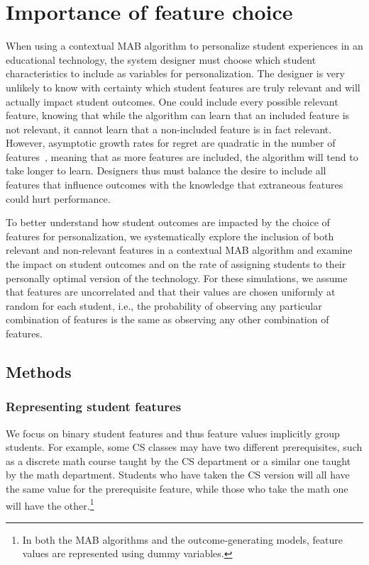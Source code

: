 \section{Importance of feature choice}

When using a contextual MAB algorithm to personalize student experiences in an educational technology, the system designer must choose which student characteristics to include as variables for personalization. The designer is very unlikely to know with certainty which student features are truly relevant and will actually impact student outcomes.
One could include every possible relevant feature, knowing that while the algorithm can learn that an included feature is not relevant, it cannot learn that a non-included feature is in fact relevant.
However, asymptotic growth rates for regret are quadratic in the number of features~\cite{agrawal2013thompson}, meaning that as more features are included, the algorithm will tend to take longer to learn. Designers thus must balance the desire to include all features that influence outcomes with the knowledge that extraneous features could hurt performance.

To better understand how student outcomes are impacted by the choice of features for personalization, we systematically explore the inclusion of both relevant and non-relevant features in a contextual MAB algorithm and examine the impact on student outcomes and on the rate of assigning students to their personally optimal version of the technology. 
For these simulations, we assume that features are uncorrelated and that their values are chosen uniformly at random for each student, i.e., the probability of observing any particular combination of features is the same as observing any other combination of features.


\subsection{Methods}

\subsubsection{Representing student features}

We focus on binary student features and thus feature values implicitly group students. For example, some CS classes may have two different prerequisites, such as a discrete math course taught by the CS department or a similar one taught by the math department. Students who have taken the CS version will all have the same value for the prerequisite feature, while those who take the math one will have the other.\footnote{In both the MAB algorithms and the outcome-generating models, feature values are represented using dummy variables.} 


